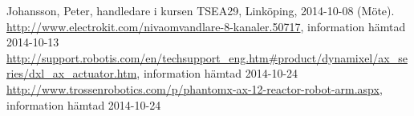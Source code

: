 \begin{thebibliography}{9}
 Johansson, Peter, handledare i kursen TSEA29, Linköping, 2014-10-08 (Möte).
 \url{http://www.electrokit.com/nivaomvandlare-8-kanaler.50717}, information hämtad 2014-10-13
 \url{http://support.robotis.com/en/techsupport_eng.htm#product/dynamixel/ax_series/dxl_ax_actuator.htm}, information hämtad 2014-10-24
 \url{http://www.trossenrobotics.com/p/phantomx-ax-12-reactor-robot-arm.aspx}, information hämtad 2014-10-24
\end{thebibliography}
